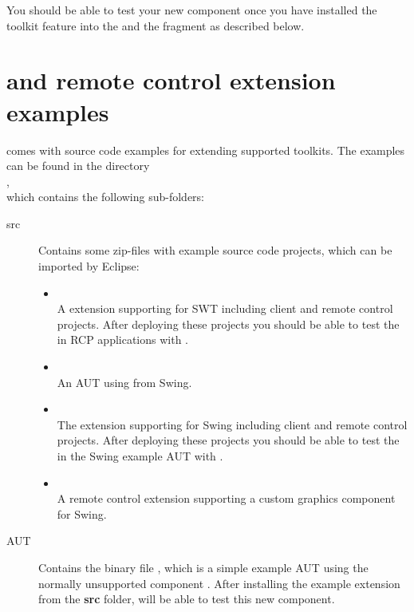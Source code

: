 You should be able to test your new component once you have installed the
toolkit feature into the \ite{} and the fragment as described below.

\section{\ite{} and remote control extension examples}
\label{extensionExamples}

\app{} comes with source code examples for extending supported toolkits. The
examples can be found in the directory\\
,\\
which contains the following sub-folders:

\begin{description}
 \item[src] Contains some zip-files with example source code projects, which
            can be imported by Eclipse:
 \begin{itemize}
   \item {}\\
         A \app{} extension supporting  for SWT including client
         and remote control projects. After deploying these projects you should
         be able to test the  in RCP applications with \app{}.
   \item {}\\
         An AUT using  from Swing.
   \item {}\\
         The \app{} extension supporting  for Swing including
         client and remote control projects. After deploying these projects you
         should be able to test the  in the Swing example AUT
         with \app{}.
   \item {}\\
         A remote control extension supporting a custom graphics
         component for Swing.
 \end{itemize}
 \item[AUT]  Contains the binary file , which is a simple
 example AUT using the normally unsupported component . After
 installing the  example extension from the \textbf{src}
 folder, \app{} will be able to test this new component.
\end{description}

